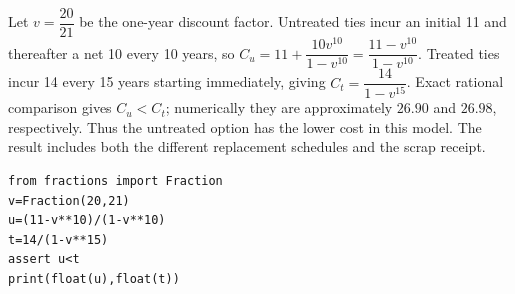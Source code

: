 Let $v=\dfrac{20}{21}$ be the one-year discount factor. Untreated ties incur an initial 11 and thereafter a net 10 every 10 years, so $C_u=11+\dfrac{10v^{10}}{1-v^{10}}=\dfrac{11-v^{10}}{1-v^{10}}$. Treated ties incur 14 every 15 years starting immediately, giving $C_t=\dfrac{14}{1-v^{15}}$. Exact rational comparison gives $C_u<C_t$; numerically they are approximately $26.90$ and $26.98$, respectively. Thus $\boxed{\text{the untreated option}}$ has the lower cost in this model. The result includes both the different replacement schedules and the scrap receipt.
\begin{verbatim}
from fractions import Fraction
v=Fraction(20,21)
u=(11-v**10)/(1-v**10)
t=14/(1-v**15)
assert u<t
print(float(u),float(t))
\end{verbatim}
